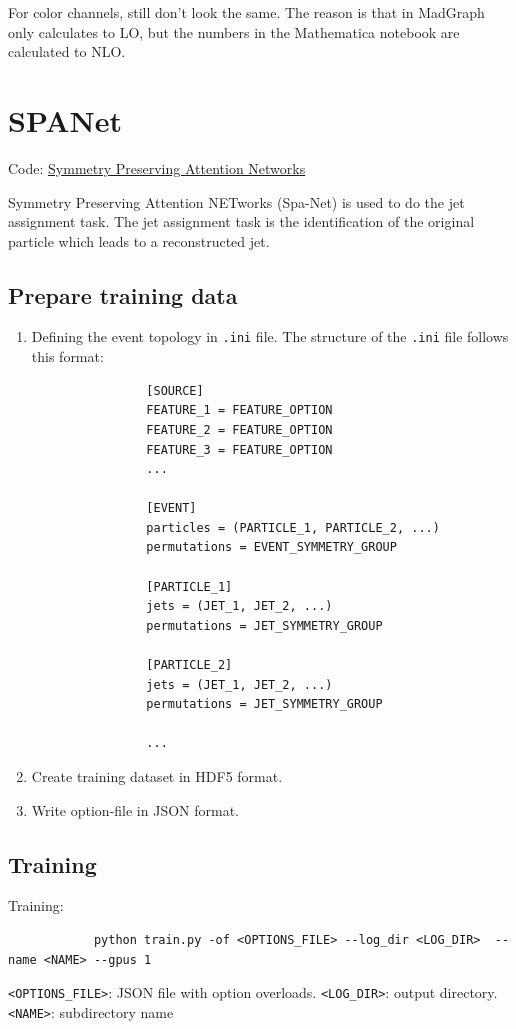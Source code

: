 \documentclass[12pt]{article}
\begin{document}
	For color channels, still don't look the same. The reason is that in MadGraph only calculates to LO, but the numbers in the Mathematica notebook are calculated to NLO.
\section{SPANet}%
\label{sec:spanet}
	Code: \href{https://github.com/Alexanders101/SPANet}{Symmetry Preserving Attention Networks}

	Symmetry Preserving Attention NETworks (Spa-Net) is used to do the jet assignment task. The jet assignment task is the identification of the original particle which leads to a reconstructed jet.

	\subsection{Prepare training data}%
	\label{sub:prepare_training_data}
		\begin{enumerate}
			\item Defining the event topology in \verb+.ini+ file. The structure of the \verb+.ini+ file follows this format:

			\begin{verbatim}
				[SOURCE]
				FEATURE_1 = FEATURE_OPTION
				FEATURE_2 = FEATURE_OPTION
				FEATURE_3 = FEATURE_OPTION
				...

				[EVENT]
				particles = (PARTICLE_1, PARTICLE_2, ...)
				permutations = EVENT_SYMMETRY_GROUP

				[PARTICLE_1]
				jets = (JET_1, JET_2, ...)
				permutations = JET_SYMMETRY_GROUP

				[PARTICLE_2]
				jets = (JET_1, JET_2, ...)
				permutations = JET_SYMMETRY_GROUP

				...
			\end{verbatim}

			\item Create training dataset in HDF5 format.

			\item Write option-file in JSON format.

		\end{enumerate}
	\subsection{Training}%
	\label{sub:training}
		Training:
		\begin{verbatim}
			python train.py -of <OPTIONS_FILE> --log_dir <LOG_DIR>  --name <NAME> --gpus 1
		\end{verbatim}
		\verb+<OPTIONS_FILE>+: JSON file with option overloads. \verb+<LOG_DIR>+: output directory. \verb+<NAME>+: subdirectory name
\end{document}
